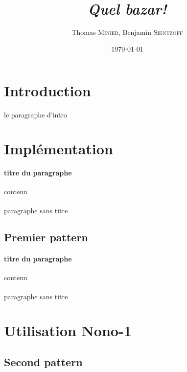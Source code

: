 \documentclass[a4paper]{article}
\title{\textit{Quel bazar!}}
\author{Thomas \textsc{Minier}, Benjamin \textsc{Sientzoff}}
\date{\today}
\begin{document}
	\maketitle
	\vspace{5cm}
	\tableofcontents
	\newpage %
	
	\section*{Introduction}
	\paragraph{}{le paragraphe d'intro}
	
	\section{Implémentation}
	
		\paragraph{titre du paragraphe}{contenu}
		\paragraph{}{paragraphe sans titre}
		
		\subsection{Premier pattern}
		\paragraph{titre du paragraphe}{contenu}
		\paragraph{}{paragraphe sans titre}
		
	\section{Utilisation Nono-1}
		\subsection{Second pattern}
\end{document}
